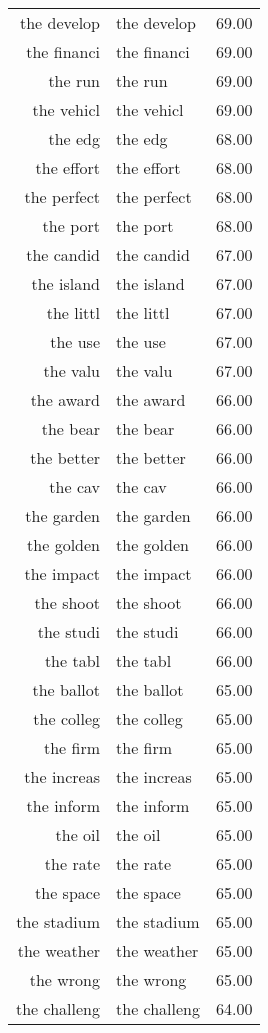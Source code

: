 \begin{table}[ht]
\begin{tabular}{rlr}
  the develop & the develop & 69.00 \\ 
  the financi & the financi & 69.00 \\ 
  the run & the run & 69.00 \\ 
  the vehicl & the vehicl & 69.00 \\ 
  the edg & the edg & 68.00 \\ 
  the effort & the effort & 68.00 \\ 
  the perfect & the perfect & 68.00 \\ 
  the port & the port & 68.00 \\ 
  the candid & the candid & 67.00 \\ 
  the island & the island & 67.00 \\ 
  the littl & the littl & 67.00 \\ 
  the use & the use & 67.00 \\ 
  the valu & the valu & 67.00 \\ 
  the award & the award & 66.00 \\ 
  the bear & the bear & 66.00 \\ 
  the better & the better & 66.00 \\ 
  the cav & the cav & 66.00 \\ 
  the garden & the garden & 66.00 \\ 
  the golden & the golden & 66.00 \\ 
  the impact & the impact & 66.00 \\ 
  the shoot & the shoot & 66.00 \\ 
  the studi & the studi & 66.00 \\ 
  the tabl & the tabl & 66.00 \\ 
  the ballot & the ballot & 65.00 \\ 
  the colleg & the colleg & 65.00 \\ 
  the firm & the firm & 65.00 \\ 
  the increas & the increas & 65.00 \\ 
  the inform & the inform & 65.00 \\ 
  the oil & the oil & 65.00 \\ 
  the rate & the rate & 65.00 \\ 
  the space & the space & 65.00 \\ 
  the stadium & the stadium & 65.00 \\ 
  the weather & the weather & 65.00 \\ 
  the wrong & the wrong & 65.00 \\ 
  the challeng & the challeng & 64.00 \\ 

\end{tabular}
\end{table}
